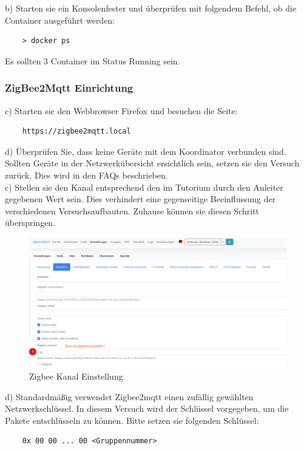 b) Starten sie ein Konsolenfester und überprüfen mit folgendem Befehl, ob die Container ausgeführt werden:
\begin{lstlisting}
    > docker ps
\end{lstlisting}

Es sollten 3 Container im Status \grqq Running\grqq{} sein. 

\subsubsection{ZigBee2Mqtt Einrichtung}

c) Starten sie den Webbrowser Firefox und besuchen die Seite:
\begin{lstlisting}
    https://zigbee2mqtt.local
\end{lstlisting}

d) Überprüfen Sie, dass keine Geräte mit dem Koordinator verbunden sind. Sollten Geräte in der Netzwerkübersicht ersichtlich sein, setzen sie den Versuch zurück.
Dies wird in den FAQs beschrieben.\\

c) Stellen sie den Kanal entsprechend den im Tutorium durch den Anleiter gegebenen Wert sein.
Dies verhindert eine gegenseitige Beeinflussung der verschiedenen Versuchsaufbauten. Zuhause können sie diesen Schritt überspringen.

\begin{figure}[H]
    \centering
    \includegraphics[width=1\textwidth]{media/Z2M-Channel.png}
    \caption{Zigbee Kanal Einstellung}
\end{figure}

d) Standardmäßig verwendet Zigbee2mqtt einen zufällig gewählten Netzwerkschlüssel. In diesem Versuch wird der Schlüssel vorgegeben, um die Pakete
entschlüsseln zu können. Bitte setzen sie folgenden Schlüssel:

\begin{lstlisting}
    0x 00 00 ... 00 <Gruppennummer>
\end{lstlisting}

